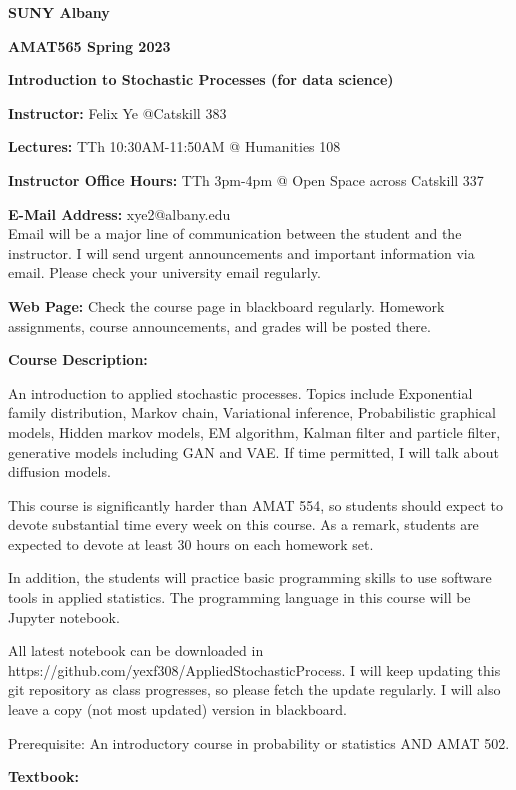 \documentclass[a4paper,10pt]{article}
\begin{document}
\begin{center}

\textbf{SUNY Albany}

\textbf{AMAT565 Spring 2023}

\textbf{Introduction to Stochastic Processes (for data science)}


\end{center}

\textbf{Instructor:} Felix Ye @Catskill 383 

\textbf{Lectures:} TTh 10:30AM-11:50AM @ Humanities 108

\textbf{Instructor Office Hours:}   TTh 3pm-4pm @ Open Space across Catskill 337


\textbf{E-Mail Address:} xye2@albany.edu\\
Email will be a major line of communication between the student and the instructor. I will send urgent announcements and important information via email. Please check your university email regularly.

\textbf{Web Page:}
Check the course page in blackboard regularly. Homework assignments, course announcements, and grades will be posted there.


\textbf{Course Description:} 	
	
An introduction to applied stochastic processes. Topics include Exponential family distribution, Markov chain, Variational inference, Probabilistic graphical models, Hidden markov models, EM algorithm, Kalman filter and particle filter, generative models including GAN and VAE. If time permitted, I will talk about diffusion models. 

This course is significantly harder than AMAT 554, so students should expect to devote substantial time every week on this course. As a remark, students are expected to devote at least 30 hours on each homework set. 

In addition, the students will practice basic programming skills to use software tools in applied statistics. The programming language in this course will be Jupyter notebook. 

All latest notebook can be downloaded in https://github.com/yexf308/AppliedStochasticProcess. I will keep updating this git repository as class progresses, so please fetch the update regularly. I will also leave a copy (not most updated) version in blackboard. 

 Prerequisite: An introductory course in probability or statistics AND AMAT 502.
 

\textbf{Textbook:} 
\end{document}
